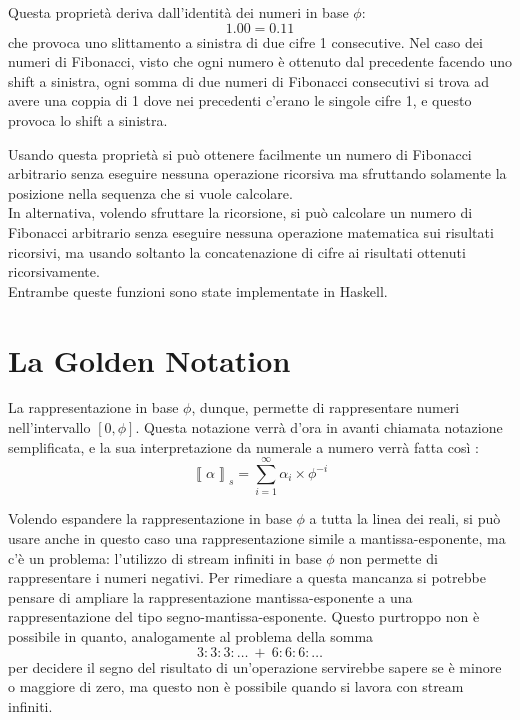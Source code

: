 \documentclass[Lau]{sapthesis}
\begin{document}
\medskip

Questa proprietà deriva dall'identità dei numeri in base $\phi$:
$$1.00 = 0.11$$
che provoca uno slittamento a sinistra di due cifre 1 consecutive. Nel caso dei numeri di Fibonacci, visto che ogni numero è ottenuto dal precedente facendo uno shift a sinistra, ogni somma di due numeri di Fibonacci consecutivi si trova ad avere una coppia di 1 dove nei precedenti c'erano le singole cifre 1, e questo provoca lo shift a sinistra.

\medskip

Usando questa proprietà si può ottenere facilmente un numero di Fibonacci arbitrario senza eseguire nessuna operazione ricorsiva ma sfruttando solamente la posizione nella sequenza che si vuole calcolare.\\
In alternativa, volendo sfruttare la ricorsione, si può calcolare un numero di Fibonacci arbitrario senza eseguire nessuna operazione matematica sui risultati ricorsivi, ma usando soltanto la concatenazione di cifre ai risultati ottenuti ricorsivamente.\\
Entrambe queste funzioni sono state implementate in Haskell. 



\chapter{La Golden Notation}
La rappresentazione in base $\phi$, dunque, permette di rappresentare numeri nell'intervallo $\left[0,\phi\right]$. Questa notazione verrà d'ora in avanti chiamata notazione semplificata, e la sua interpretazione da numerale a numero verrà fatta così \cite{PietroDiGianantonio}:
$$\left\llbracket \alpha \right\rrbracket_s = \sum_{i=1}^{\infty} \alpha_i \times \phi^{-i}$$

Volendo espandere la rappresentazione in base $\phi$ a tutta la linea dei reali, si può usare anche in questo caso una rappresentazione simile a mantissa-esponente, ma c'è un problema: l'utilizzo di stream infiniti in base $\phi$ non permette di rappresentare i numeri negativi. Per rimediare a questa mancanza si potrebbe pensare di ampliare la rappresentazione mantissa-esponente a una rappresentazione del tipo segno-mantissa-esponente. Questo purtroppo non è possibile in quanto, analogamente al problema della somma
$$3:3:3:\ldots \ + \ 6:6:6:\ldots$$
per decidere il segno del risultato di un'operazione servirebbe sapere se è minore o maggiore di zero, ma questo non è possibile quando si lavora con stream infiniti.
\end{document}
